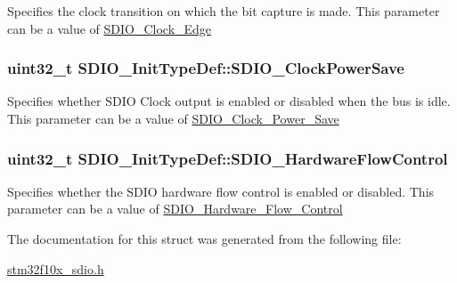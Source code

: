 \label{structSDIO__InitTypeDef_a3252c846b68988b8ae70ca0d40030a52}
Specifies the clock transition on which the bit capture is made. This parameter can be a value of \hyperlink{group__SDIO__Clock__Edge}{SDIO\_\-Clock\_\-Edge} \hypertarget{structSDIO__InitTypeDef_ac236cc5a376a65b9de64a31dab816364}{
\subsubsection[{SDIO\_\-ClockPowerSave}]{\setlength{\rightskip}{0pt plus 5cm}uint32\_\-t {\bf SDIO\_\-InitTypeDef::SDIO\_\-ClockPowerSave}}}
\label{structSDIO__InitTypeDef_ac236cc5a376a65b9de64a31dab816364}
Specifies whether SDIO Clock output is enabled or disabled when the bus is idle. This parameter can be a value of \hyperlink{group__SDIO__Clock__Power__Save}{SDIO\_\-Clock\_\-Power\_\-Save} \hypertarget{structSDIO__InitTypeDef_a5f57f8aca913de9aed47ef708c05f34f}{
\subsubsection[{SDIO\_\-HardwareFlowControl}]{\setlength{\rightskip}{0pt plus 5cm}uint32\_\-t {\bf SDIO\_\-InitTypeDef::SDIO\_\-HardwareFlowControl}}}
\label{structSDIO__InitTypeDef_a5f57f8aca913de9aed47ef708c05f34f}
Specifies whether the SDIO hardware flow control is enabled or disabled. This parameter can be a value of \hyperlink{group__SDIO__Hardware__Flow__Control}{SDIO\_\-Hardware\_\-Flow\_\-Control} 

The documentation for this struct was generated from the following file:\begin{DoxyCompactItemize}
\item 
\hyperlink{stm32f10x__sdio_8h}{stm32f10x\_\-sdio.h}\end{DoxyCompactItemize}

